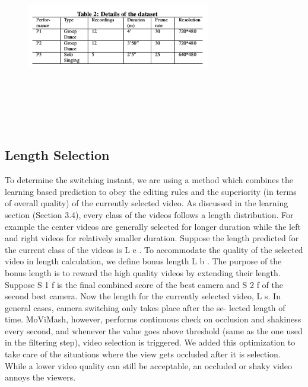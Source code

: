 \documentclass{sig-alternate}
\begin{document}
\begin{figure}
\centering
\includegraphics[height = 8cm,width=8cm]{table2.png}
\end{figure}

\subsection{Length Selection}

To determine the switching instant, we are using a method which
combines the learning based prediction to obey the editing rules and
the superiority (in terms of overall quality) of the currently selected
video. As discussed in the learning section (Section 3.4), every
class of the videos follows a length distribution. For example the
center videos are generally selected for longer duration while the
left and right videos for relatively smaller duration.
Suppose the length predicted for the current class of the videos
is L e . To accommodate the quality of the selected video in length
calculation, we define bonus length L b . The purpose of the bonus
length is to reward the high quality videos by extending their length.
Suppose S 1 f is the final combined score of the best camera and S 2 f
of the second best camera. Now the length for the currently selected
video, L s.
In general cases, camera switching only takes place after the se-
lected length of time. MoViMash, however, performs continuous
check on occlusion and shakiness every second, and whenever the
value goes above threshold (same as the one used in the filtering
step), video selection is triggered. We added this optimization to
take care of the situations where the view gets occluded after it is
selection. While a lower video quality can still be acceptable, an
occluded or shaky video annoys the viewers.
\end{document}
